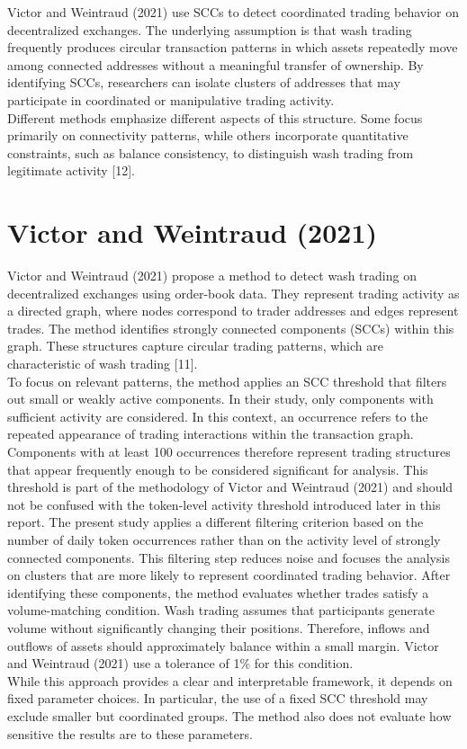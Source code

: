 \documentclass[language=english,thesis=bachelor,nosecondtitle,faculty=cb,onesided,12pt]{hsmw-thesis}
\begin{document}
Victor and Weintraud (2021) use SCCs to detect coordinated trading behavior on decentralized exchanges. The underlying assumption is that wash trading frequently produces circular transaction patterns in which assets repeatedly move among connected addresses without a meaningful transfer of ownership. By identifying SCCs, researchers can isolate clusters of addresses that may participate in coordinated or manipulative trading activity.\\
Different methods emphasize different aspects of this structure. Some focus primarily on connectivity patterns, while others incorporate quantitative constraints, such as balance consistency, to distinguish wash trading from legitimate activity [12].

	\section{Victor and Weintraud (2021)}
Victor and Weintraud (2021) propose a method to detect wash trading on decentralized exchanges using order-book data. They represent trading activity as a directed graph, where nodes correspond to trader addresses and edges represent trades.
The method identifies strongly connected components (SCCs) within this graph. These structures capture circular trading patterns, which are characteristic of wash trading [11].\\
To focus on relevant patterns, the method applies an SCC threshold that filters out small or weakly active components. In their study, only components with sufficient activity are considered. In this context, an occurrence refers to the repeated appearance of trading interactions within the transaction graph. Components with at least 100 occurrences therefore represent trading structures that appear frequently enough to be considered significant for analysis. This threshold is part of the methodology of Victor and Weintraud (2021) and should not be confused with the token-level activity threshold introduced later in this report. The present study applies a different filtering criterion based on the number of daily token occurrences rather than on the activity level of strongly connected components. This filtering step reduces noise and focuses the analysis on clusters that are more likely to represent coordinated trading behavior.
After identifying these components, the method evaluates whether trades satisfy a volume-matching condition. Wash trading assumes that participants generate volume without significantly changing their positions. Therefore, inflows and outflows of assets should approximately balance within a small margin. Victor and Weintraud (2021) use a tolerance of 1\% for this condition.\\
While this approach provides a clear and interpretable framework, it depends on fixed parameter choices. In particular, the use of a fixed SCC threshold may exclude smaller but coordinated groups. The method also does not evaluate how sensitive the results are to these parameters.
\end{document}
